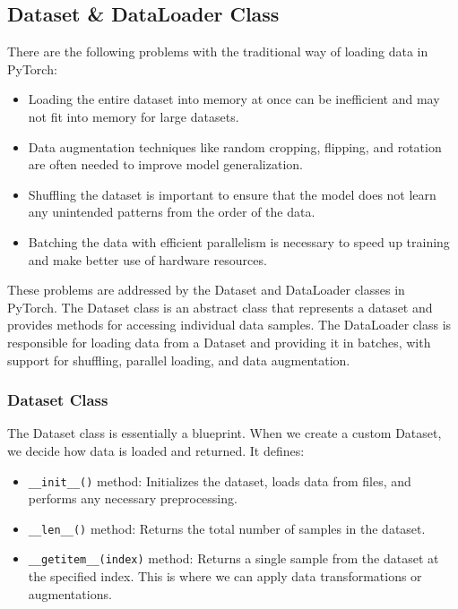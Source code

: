 \documentclass[12pt, a4paper]{article}
\begin{document}
\subsection{Dataset \& DataLoader Class}

There are the following problems with the traditional way of loading data in PyTorch:
\begin{itemize}
    \item Loading the entire dataset into memory at once can be inefficient and may not fit into memory for large datasets.
    \item Data augmentation techniques like random cropping, flipping, and rotation are often needed to improve model generalization.
    \item Shuffling the dataset is important to ensure that the model does not learn any unintended patterns from the order of the data.
    \item Batching the data with efficient parallelism is necessary to speed up training and make better use of hardware resources.
\end{itemize}

These problems are addressed by the Dataset and DataLoader classes in PyTorch. The Dataset class is an abstract class that represents a dataset and provides methods for accessing individual data samples. The DataLoader class is responsible for loading data from a Dataset and providing it in batches, with support for shuffling, parallel loading, and data augmentation.

\subsubsection{Dataset Class}

The Dataset class is essentially a blueprint. When we create a custom Dataset, we decide how data is loaded and returned. It defines:

\vspace{-0.6em}

\begin{itemize}[itemsep=0.1em]
    \item \texttt{\_\_init\_\_()} method: Initializes the dataset, loads data from files, and performs any necessary preprocessing.
    \item \texttt{\_\_len\_\_()} method: Returns the total number of samples in the dataset.
    \item \texttt{\_\_getitem\_\_(index)} method: Returns a single sample from the dataset at the specified index. This is where we can apply data transformations or augmentations.
\end{itemize}
\end{document}
